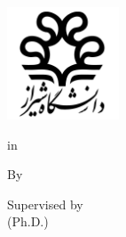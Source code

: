 \begin{titlepage}
    \begin{latin}
        \centering\bfseries
        \includegraphics[width=0.25\textwidth]{assets/shiraz_university_logo}

        {\LatinUniversity}

        \vspace{\baselineskip}
        {\large \LatinSchool}

        {\large {\LatinDegreeAbbr} {\LatinType} in \\ {\LatinField}}

        \vspace{3\baselineskip}
        {\Large \LatinTitle}

        \vspace{3\baselineskip}
        By \\
        {\large \LatinName}

        \vspace{2\baselineskip}
        Supervised by \\
        {\large {\LatinSupervisor} (Ph.D.)}

        \vspace{\baselineskip}
        {\large \LatinDate}
    \end{latin}
\end{titlepage}

